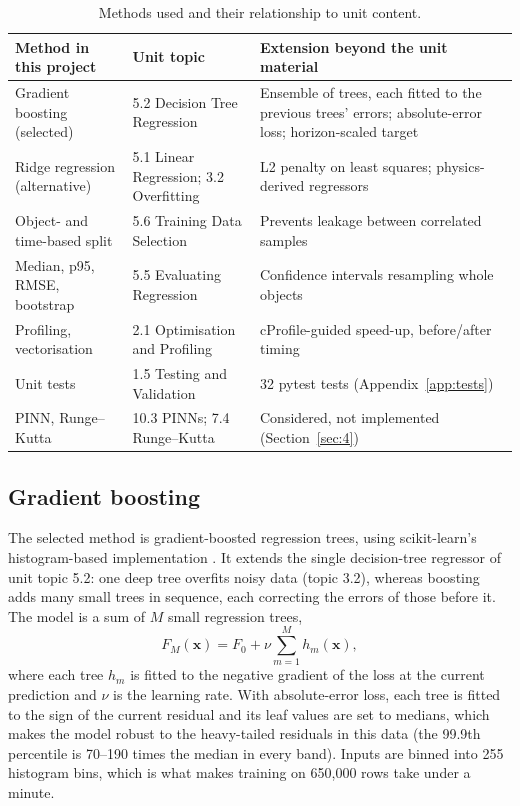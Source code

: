 \documentclass[11pt, a4paper]{article}
\begin{document}
\begin{table}[htbp]
\centering
\small
\captionsetup{width=0.8\linewidth}
\caption{Methods used and their relationship to unit content.}
\label{tab:unit}
\begin{tabular}{L{3.6cm}L{4.4cm}L{7.2cm}}
\toprule
Method in this project & Unit topic & Extension beyond the unit material \\
\midrule
Gradient boosting (selected) & 5.2 Decision Tree Regression & Ensemble of trees, each fitted to the previous trees' errors; absolute-error loss; horizon-scaled target \\
Ridge regression (alternative) & 5.1 Linear Regression; 3.2 Overfitting & L2 penalty on least squares; physics-derived regressors \\
Object- and time-based split & 5.6 Training Data Selection & Prevents leakage between correlated samples \\
Median, p95, RMSE, bootstrap & 5.5 Evaluating Regression & Confidence intervals resampling whole objects \\
Profiling, vectorisation & 2.1 Optimisation and Profiling & cProfile-guided speed-up, before/after timing \\
Unit tests & 1.5 Testing and Validation & 32 pytest tests (Appendix~\ref{app:tests}) \\
PINN, Runge--Kutta & 10.3 PINNs; 7.4 Runge--Kutta & Considered, not implemented (Section~\ref{sec:4}) \\
\bottomrule
\end{tabular}
\end{table}

\subsection{Gradient boosting}

The selected method is gradient-boosted regression trees, using scikit-learn's histogram-based implementation \cite{friedman2001,ke2017,pedregosa2011}. It extends the single decision-tree regressor of unit topic 5.2: one deep tree overfits noisy data (topic 3.2), whereas boosting adds many small trees in sequence, each correcting the errors of those before it. The model is a sum of $M$ small regression trees,
\begin{equation}
F_M(\mathbf{x}) = F_0 + \nu \sum_{m=1}^{M} h_m(\mathbf{x}),
\end{equation}
where each tree $h_m$ is fitted to the negative gradient of the loss at the current prediction and $\nu$ is the learning rate. With absolute-error loss, each tree is fitted to the sign of the current residual and its leaf values are set to medians, which makes the model robust to the heavy-tailed residuals in this data (the 99.9th percentile is 70--190 times the median in every band). Inputs are binned into 255 histogram bins, which is what makes training on 650,000 rows take under a minute.
\end{document}
